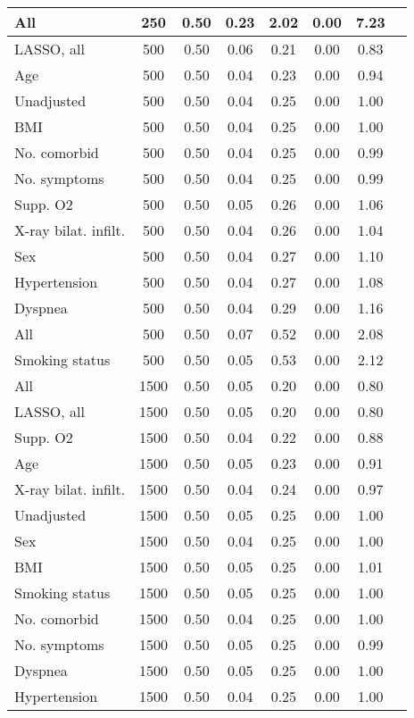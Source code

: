 \documentclass{article}
\begin{document}
{\begin{longtable}{lccccccc}
All & 250 & 0.50 & 0.23 & 2.02 & 0.00 & 7.23 \\ \midrule 
LASSO, all & 500 & 0.50 & 0.06 & 0.21 & 0.00 & 0.83 \\ 
Age & 500 & 0.50 & 0.04 & 0.23 & 0.00 & 0.94 \\ 
Unadjusted & 500 & 0.50 & 0.04 & 0.25 & 0.00 & 1.00 \\ 
BMI & 500 & 0.50 & 0.04 & 0.25 & 0.00 & 1.00 \\ 
No. comorbid & 500 & 0.50 & 0.04 & 0.25 & 0.00 & 0.99 \\ 
No. symptoms & 500 & 0.50 & 0.04 & 0.25 & 0.00 & 0.99 \\ 
Supp. O2 & 500 & 0.50 & 0.05 & 0.26 & 0.00 & 1.06 \\ 
X-ray bilat. infilt. & 500 & 0.50 & 0.04 & 0.26 & 0.00 & 1.04 \\ 
Sex & 500 & 0.50 & 0.04 & 0.27 & 0.00 & 1.10 \\ 
Hypertension & 500 & 0.50 & 0.04 & 0.27 & 0.00 & 1.08 \\ 
Dyspnea & 500 & 0.50 & 0.04 & 0.29 & 0.00 & 1.16 \\ 
All & 500 & 0.50 & 0.07 & 0.52 & 0.00 & 2.08 \\ 
Smoking status & 500 & 0.50 & 0.05 & 0.53 & 0.00 & 2.12 \\ \midrule 
All & 1500 & 0.50 & 0.05 & 0.20 & 0.00 & 0.80 \\ 
LASSO, all & 1500 & 0.50 & 0.05 & 0.20 & 0.00 & 0.80 \\ 
Supp. O2 & 1500 & 0.50 & 0.04 & 0.22 & 0.00 & 0.88 \\ 
Age & 1500 & 0.50 & 0.05 & 0.23 & 0.00 & 0.91 \\ 
X-ray bilat. infilt. & 1500 & 0.50 & 0.04 & 0.24 & 0.00 & 0.97 \\ 
Unadjusted & 1500 & 0.50 & 0.05 & 0.25 & 0.00 & 1.00 \\ 
Sex & 1500 & 0.50 & 0.04 & 0.25 & 0.00 & 1.00 \\ 
BMI & 1500 & 0.50 & 0.05 & 0.25 & 0.00 & 1.01 \\ 
Smoking status & 1500 & 0.50 & 0.05 & 0.25 & 0.00 & 1.00 \\ 
No. comorbid & 1500 & 0.50 & 0.04 & 0.25 & 0.00 & 1.00 \\ 
No. symptoms & 1500 & 0.50 & 0.05 & 0.25 & 0.00 & 0.99 \\ 
Dyspnea & 1500 & 0.50 & 0.05 & 0.25 & 0.00 & 1.00 \\ 
Hypertension & 1500 & 0.50 & 0.04 & 0.25 & 0.00 & 1.00 \\
\bottomrule
\hline
\end{longtable}
}
\end{document}
